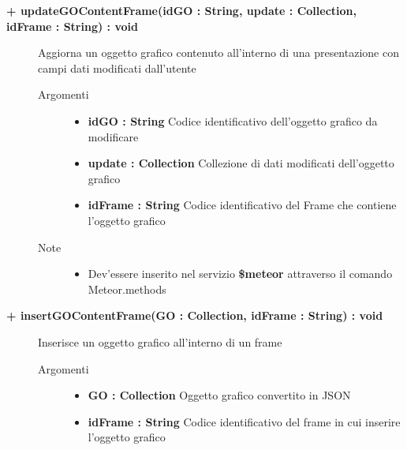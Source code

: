 \begin{description}
	\begin{description}
		\item[\textbf{\color{blue}+ updateGOContentFrame(idGO : String, update : Collection, idFrame : String) : void			}] \hfill
			Aggiorna un oggetto grafico contenuto all'interno di una presentazione con  campi dati modificati dall'utente
			
		\begin{description}
			\item[Argomenti] \hfill
				\begin{itemize}
				
					\item \textbf{idGO : String			} \hfill
					Codice identificativo dell'oggetto grafico da modificare
					\item \textbf{update : Collection			} \hfill
					Collezione di dati modificati dell'oggetto grafico
					\item \textbf{idFrame :  String		} \hfill
					Codice identificativo del Frame che contiene l'oggetto grafico
					
				\end{itemize}
			\item[Note] \hfill
			\begin{itemize}
					\item Dev'essere inserito nel servizio \textbf{\$meteor} attraverso il comando Meteor.methods
				\end{itemize}
		\end{description}
	\end{description}
	
	\begin{description}
		\item[\textbf{\color{blue}+ insertGOContentFrame(GO : Collection, idFrame : String) : void			}] \hfill
			Inserisce un oggetto grafico all'interno di un frame
			
		\begin{description}
			\item[Argomenti] \hfill
				\begin{itemize}
				
					\item \textbf{GO : Collection			} \hfill
					Oggetto grafico convertito in JSON
					\item \textbf{idFrame : String		} \hfill
					Codice identificativo del frame in cui inserire l'oggetto grafico
					

\end{itemize}
\end{description}
\end{description}
\end{description}
